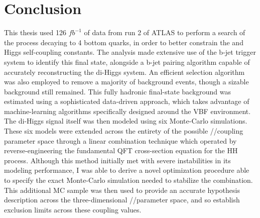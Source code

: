 \chapter{Conclusion}\label{chapter:conclusion}

This thesis used 126 $\textit{fb}^{-1}$ of data from run 2 of ATLAS
    to perform a search of the \hhproc process decaying to 4 bottom quarks,
    in order to better constrain the \kl and \kvv Higgs self-coupling constants.
The analysis made extensive use of the b-jet trigger system to identify this final state,
    alongside a b-jet pairing algorithm capable of accurately reconstructing the di-Higgs system.
An efficient selection algorithm was also employed to remove a majority of background events,
    though a sizable background still remained.
This fully hadronic final-state background was estimated using a sophisticated data-driven approach,
    which takes advantage of machine-learning algorithms specifically designed around the VBF environment.
The di-Higgs signal itself was then modeled using six Monte-Carlo simulations.
These six models were extended across the entirety of the possible \kvv/\kl/\kvv coupling parameter space
    through a linear combination technique
    which operated by reverse-engineering the fundamental QFT cross-section equation for the HH process.
Although this method initially met with severe instabilities in its modeling performance,
    I was able to derive a novel optimization procedure able to specify
    the exact Monte-Carlo simulation needed to stabilize the combination.
This additional MC sample was then used to provide an accurate hypothesis description across
    the three-dimensional \kvv/\kl/\kv parameter space,
    and so establish exclusion limits across these coupling values. 

